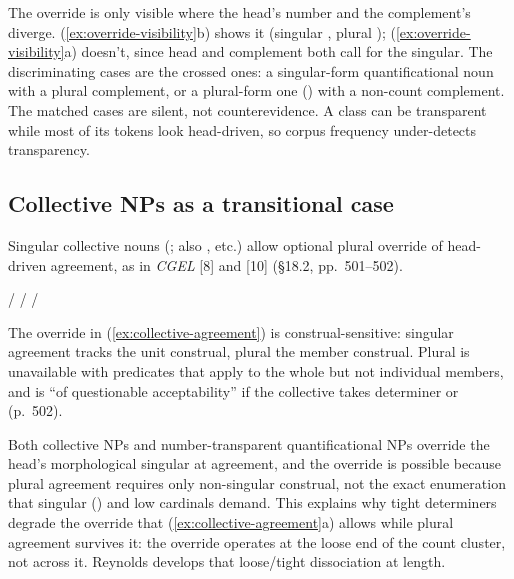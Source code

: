 The override is only visible where the head's number and the complement's diverge. (\ref{ex:override-visibility}b) shows it (singular , plural ); (\ref{ex:override-visibility}a) doesn't, since head and complement both call for the singular. The discriminating cases are the crossed ones: a singular-form quantificational noun with a plural complement, or a plural-form one () with a non-count complement. The matched cases are silent, not counterevidence. A class can be transparent while most of its tokens look head-driven, so corpus frequency under-detects transparency.

\subsection{Collective NPs as a transitional case}\label{sec:2-2}

Singular collective nouns (; also , etc.) allow optional plural override of head-driven agreement, as in \textit{CGEL} [8] and [10] (§18.2, pp.~501--502).

\ea\label{ex:collective-agreement}
\ea {}/ 
\ex {}/ 
\ex {}/ 
\z
\z

The override in (\ref{ex:collective-agreement}) is construal-sensitive: singular agreement tracks the unit construal, plural the member construal. Plural is unavailable with predicates that apply to the whole but not individual members, and is \enquote{of questionable acceptability} if the collective takes determiner  or  (p.~502).

Both collective NPs and number-transparent quantificational NPs override the head's morphological singular at agreement, and the override is possible because plural agreement requires only non-singular construal, not the exact enumeration that singular () and low cardinals demand. This explains why tight determiners degrade the override that (\ref{ex:collective-agreement}a) allows while plural agreement survives it: the override operates at the loose end of the count cluster, not across it. Reynolds \autocite*{reynolds2026countability} develops that loose/tight dissociation at length.

